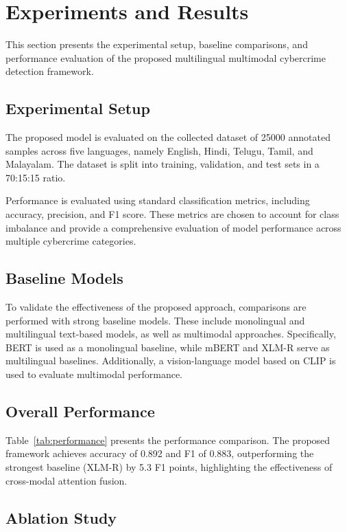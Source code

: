 \section{Experiments and Results}

This section presents the experimental setup, baseline comparisons, and performance evaluation of the proposed multilingual multimodal cybercrime detection framework.

\subsection{Experimental Setup}

The proposed model is evaluated on the collected dataset of 25000 annotated samples across five languages, namely English, Hindi, Telugu, Tamil, and Malayalam. The dataset is split into training, validation, and test sets in a 70:15:15 ratio. 

Performance is evaluated using standard classification metrics, including accuracy, precision, and F1 score. These metrics are chosen to account for class imbalance and provide a comprehensive evaluation of model performance across multiple cybercrime categories.

\subsection{Baseline Models}

To validate the effectiveness of the proposed approach, comparisons are performed with strong baseline models. These include monolingual and multilingual text-based models, as well as multimodal approaches. Specifically, BERT is used as a monolingual baseline, while mBERT and XLM-R serve as multilingual baselines. Additionally, a vision-language model based on CLIP is used to evaluate multimodal performance.

\subsection{Overall Performance}

Table~\ref{tab:performance} presents the performance comparison. The proposed framework achieves accuracy of 0.892 and F1 of 0.883, outperforming the strongest baseline (XLM-R) by 5.3 F1 points, highlighting the effectiveness of cross-modal attention fusion.

\subsection{Ablation Study}

